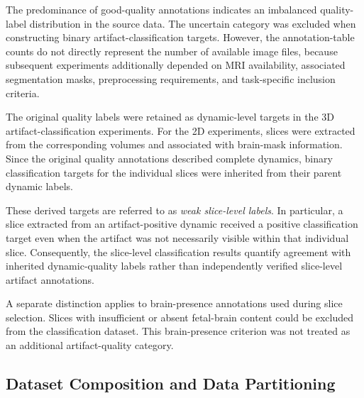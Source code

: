 %
%

The predominance of good-quality annotations indicates an imbalanced quality-label distribution in the source data. The uncertain category was excluded when constructing binary artifact-classification targets. However, the annotation-table counts do not directly represent the number of available image files, because subsequent experiments additionally depended on MRI availability, associated segmentation masks, preprocessing requirements, and task-specific inclusion criteria.

The original quality labels were retained as dynamic-level targets in the 3D artifact-classification experiments. For the 2D experiments, slices were extracted from the corresponding volumes and associated with brain-mask information. Since the original quality annotations described complete dynamics, binary classification targets for the individual slices were inherited from their parent dynamic labels.

These derived targets are referred to as \emph{weak slice-level labels}. In particular, a slice extracted from an artifact-positive dynamic received a positive classification target even when the artifact was not necessarily visible within that individual slice. Consequently, the slice-level classification results quantify agreement with inherited dynamic-quality labels rather than independently verified slice-level artifact annotations.

A separate distinction applies to brain-presence annotations used during slice selection. Slices with insufficient or absent fetal-brain content could be excluded from the classification dataset. This brain-presence criterion was not treated as an additional artifact-quality category.

\subsection{Dataset Composition and Data Partitioning}
\label{subsec:results_dataset_splits}

